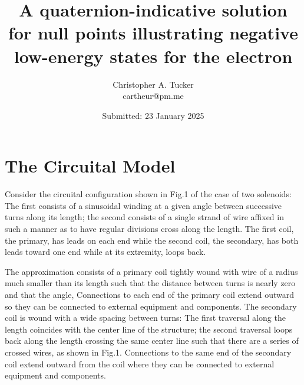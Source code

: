 \documentclass[]{article}
\begin{document}
\title{A quaternion-indicative solution for null points illustrating negative low-energy states for the electron}

\author{Christopher A. Tucker\\cartheur@pm.me\\}

\date{Submitted: 23 January 2025}

\maketitle



\section{\label{sec:level1}The Circuital Model}

Consider the circuital configuration shown in Fig.1 of the case of two solenoids: The first consists of a sinusoidal winding at a given angle between successive turns along its length; the second consists of a single strand of wire affixed in such a manner as to have regular divisions cross along the length. The first coil, the primary, has leads on each end while the second coil, the secondary, has both leads toward one end while at its extremity, loops back.

The approximation consists of a primary coil tightly wound with wire of a radius much smaller than its length such that the distance between turns is nearly zero and that the angle,   Connections to each end of the primary coil extend outward so they can be connected to external equipment and components. The secondary coil is wound with a wide spacing between turns: The first traversal along the length coincides with the center line of the structure; the second traversal loops back along the length crossing the same center line such that there are a series of crossed wires, as shown in Fig.1. Connections to the same end of the secondary coil extend outward from the coil where they can be connected to external equipment and components.
\end{document}
